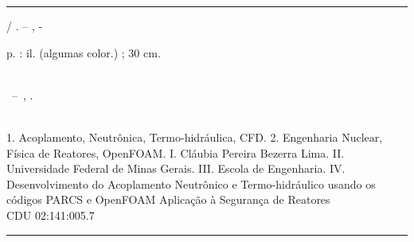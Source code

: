 \documentclass[12pt,openright,twoside,a4paper,english,french,spanish,brazil]{abntex2}
\begin{document}
\frenchspacing 

\pretextual

\imprimircapa

\imprimirfolhaderosto*


%
%     
\begin{fichacatalografica}
	\vspace*{\fill}					%
	\hrule							%
	\begin{center}					%
	\begin{minipage}[c]{12.5cm}		%
	
	\imprimirautor
	
	\hspace{0.5cm} \imprimirtitulo  / \imprimirautor. --
	\imprimirlocal, \imprimirdata-
	
	\hspace{0.5cm} \pageref{LastPage} p. : il. (algumas color.) ; 30 cm.\\
	
	\hspace{0.5cm} \imprimirorientadorRotulo~\imprimirorientador\\
	
	\hspace{0.5cm}
	\parbox[t]{\textwidth}{\imprimirtipotrabalho~--~\imprimirinstituicao,
	\imprimirdata.}\\
	
	\hspace{0.5cm}
		1. Acoplamento, Neutrônica, Termo-hidráulica, CFD.
		2. Engenharia Nuclear, Física de Reatores, OpenFOAM.
		I. Cláubia Pereira Bezerra Lima.
		II. Universidade Federal de Minas Gerais.
		III. Escola de Engenharia.
		IV. Desenvolvimento do Acoplamento Neutrônico e Termo-hidráulico 
                usando os códigos PARCS e OpenFOAM Aplicação à Segurança de Reatores\\ 			
	
	\hspace{8.75cm} CDU 02:141:005.7\\
	
	\end{minipage}
	\end{center}
	\hrule
\end{fichacatalografica}
\end{document}
